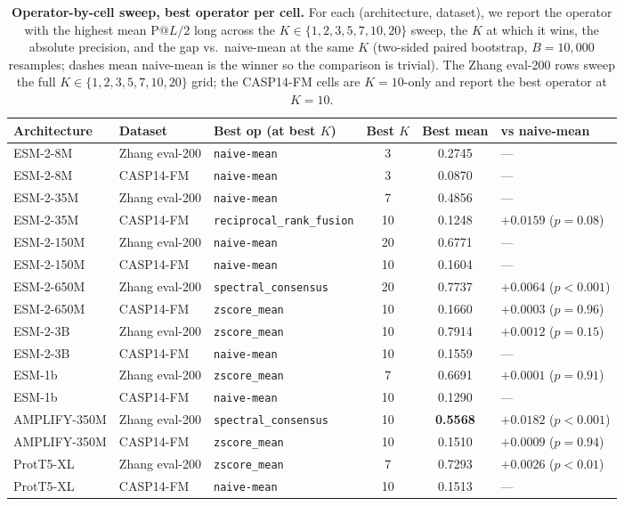 \documentclass{article}
\begin{document}
\begin{table}[h]
\centering
\footnotesize
\caption{\textbf{Operator-by-cell sweep, best operator per cell.}
For each (architecture, dataset), we report the operator with the
highest mean $\text{P}@L/2$ long across the $K \in \{1,2,3,5,7,10,20\}$
sweep, the $K$ at which it wins, the absolute precision, and the
gap vs.\ naive-mean at the same $K$ (two-sided paired bootstrap,
$B{=}10{,}000$ resamples; dashes mean naive-mean is the winner so
the comparison is trivial). The Zhang eval-200 rows sweep the full
$K \in \{1,2,3,5,7,10,20\}$ grid; the CASP14-FM cells are
$K{=}10$-only and report the best operator at $K{=}10$.}
\label{tab:operators-best}
\begin{tabular}{lllccl}
\toprule
Architecture & Dataset & Best op (at best $K$) & Best $K$ & Best mean & vs naive-mean \\
\midrule
ESM-2-8M     & Zhang eval-200 & \texttt{naive-mean}             & 3  & 0.2745 & --- \\
ESM-2-8M     & CASP14-FM & \texttt{naive-mean}             & 3  & 0.0870 & --- \\
ESM-2-35M    & Zhang eval-200 & \texttt{naive-mean}             & 7  & 0.4856 & --- \\
ESM-2-35M    & CASP14-FM & \texttt{reciprocal\_rank\_fusion} & 10 & 0.1248 & $+0.0159$ ($p{=}0.08$) \\
ESM-2-150M   & Zhang eval-200 & \texttt{naive-mean}             & 20 & 0.6771 & --- \\
ESM-2-150M   & CASP14-FM & \texttt{naive-mean}             & 10 & 0.1604 & --- \\
ESM-2-650M   & Zhang eval-200 & \texttt{spectral\_consensus}     & 20 & 0.7737 & $+0.0064$ ($p{<}0.001$) \\
ESM-2-650M   & CASP14-FM & \texttt{zscore\_mean}            & 10 & 0.1660 & $+0.0003$ ($p{=}0.96$) \\
ESM-2-3B     & Zhang eval-200 & \texttt{zscore\_mean}            & 10 & 0.7914 & $+0.0012$ ($p{=}0.15$) \\
ESM-2-3B     & CASP14-FM & \texttt{naive-mean}             & 10 & 0.1559 & --- \\
ESM-1b       & Zhang eval-200 & \texttt{zscore\_mean}            & 7  & 0.6691 & $+0.0001$ ($p{=}0.91$) \\
ESM-1b       & CASP14-FM & \texttt{naive-mean}             & 10 & 0.1290 & --- \\
AMPLIFY-350M & Zhang eval-200 & \texttt{spectral\_consensus}     & 10 & \textbf{0.5568} & $\mathbf{+0.0182}$ ($p{<}0.001$) \\
AMPLIFY-350M & CASP14-FM & \texttt{zscore\_mean}            & 10 & 0.1510 & $+0.0009$ ($p{=}0.94$) \\
ProtT5-XL    & Zhang eval-200 & \texttt{zscore\_mean}            & 7  & 0.7293 & $+0.0026$ ($p{<}0.01$) \\
ProtT5-XL    & CASP14-FM & \texttt{naive-mean}             & 10 & 0.1513 & --- \\
\bottomrule
\end{tabular}
\end{table}
\end{document}
